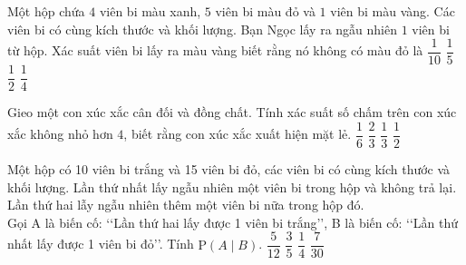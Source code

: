 \begin{ex}%
	Một hộp chứa $4$ viên bi màu xanh, $5$ viên bi màu đỏ và $1$  viên bi màu vàng. Các viên bi có cùng kích thước và khối lượng. Bạn Ngọc lấy ra ngẫu nhiên $1$ viên bi từ hộp. Xác suất viên bi lấy ra màu vàng biết rằng nó không có màu đỏ là
	 \choice
		 {$\dfrac{1}{10}$}
		 {\True $\dfrac{1}{5}$}
		 {$\dfrac{1}{2}$}
		{$\dfrac{1}{4}$} 
\end{ex}

\begin{ex}%
	Gieo một con xúc xắc cân đối và đồng chất. Tính xác suất số chấm trên con xúc xắc không nhỏ hơn  $4$, biết rằng con xúc xắc xuất hiện mặt lẻ.
	 \choice
		 {$\dfrac{1}{6}$}
		 {$\dfrac{2}{3}$}
		 {\True $\dfrac{1}{3}$}
		{$\dfrac{1}{2}$} 
\end{ex}

\begin{ex}%
	Một hộp có 10 viên bi trắng và 15 viên bi đỏ, các viên bi có cùng kích  thước và khối lượng. Lần thứ nhất lấy ngẫu nhiên một viên bi trong hộp và không trả lại. Lần thứ hai lẫy ngẫu nhiên thêm một viên bi nữa trong hộp đó.\\
	Gọi A là biến cố: \lq\lq Lần thứ hai lấy được 1 viên bi trắng\rq\rq, 
	B là biến cố: \lq\lq Lần thứ nhất lấy được  1 viên bi đỏ\rq\rq.
	Tính $\mathrm{P}\left(A\mid B\right)$. 
	 \choice
		{\True $\dfrac{5}{12}$} 
		 {$\dfrac{3}{5}$}
		{$\dfrac{1}{4}$} 
		{$\dfrac{7}{30}$} 
\end{ex}

